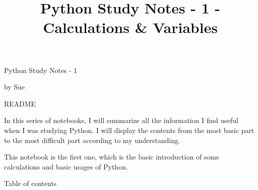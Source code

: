 \documentclass[11pt]{article}
\title{Python Study Notes - 1 - Calculations \& Variables}
\begin{document}
    
    \maketitle
    
    

    
    Python Study Notes - 1

by Sue

    README

In this series of notebooks, I will summarize all the information I find
useful when I was studying Python. I will display the contents from the
most basic part to the most difficult part according to my
understanding.

This notebook is the first one, which is the basic introduction of some
calculations and basic usages of Python.

    Table of contents
\end{document}
